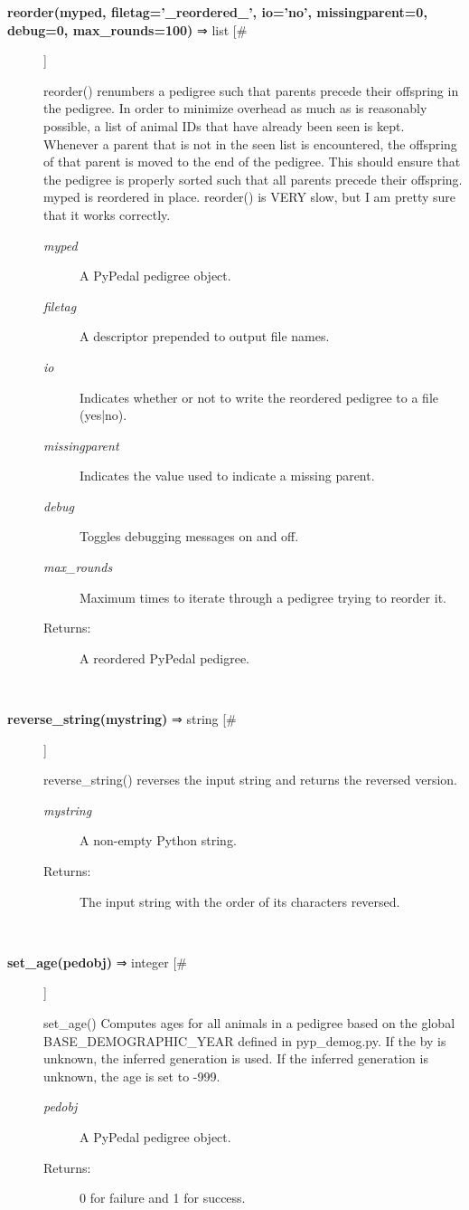 \begin{description}
\item[\textbf{reorder(myped, filetag='\_reordered\_', io='no', missingparent=0, debug=0, max\_rounds=100)} ⇒ list [\#]
]
\par reorder() renumbers a pedigree such that parents precede their offspring in the
pedigree.  In order to minimize overhead as much as is reasonably possible,
a list of animal IDs that have already been seen is kept.  Whenever a parent
that is not in the seen list is encountered, the offspring of that parent is
moved to the end of the pedigree.  This should ensure that the pedigree is
properly sorted such that all parents precede their offspring.  myped is
reordered in place.  reorder() is VERY slow, but I am pretty sure that it works
correctly.
\begin{description}
\item[\textit{myped}
]
A PyPedal pedigree object.
\item[\textit{filetag}
]
A descriptor prepended to output file names.
\item[\textit{io}
]
Indicates whether or not to write the reordered pedigree to a file (yes|no).
\item[\textit{missingparent}
]
Indicates the value used to indicate a missing parent.
\item[\textit{debug}
]
Toggles debugging messages on and off.
\item[\textit{max\_rounds}
]
Maximum times to iterate through a pedigree trying to reorder it.
\item[Returns:
]
A reordered PyPedal pedigree.
\end{description}\\

\item[\textbf{reverse\_string(mystring)} ⇒ string [\#]
]
\par reverse\_string() reverses the input string and returns the reversed version.
\begin{description}
\item[\textit{mystring}
]
A non-empty Python string.
\item[Returns:
]
The input string with the order of its characters reversed.
\end{description}\\

\item[\textbf{set\_age(pedobj)} ⇒ integer [\#]
]
\par set\_age() Computes ages for all animals in a pedigree based on the global
BASE\_DEMOGRAPHIC\_YEAR defined in pyp\_demog.py.  If the by is unknown, the
inferred generation is used.  If the inferred generation is unknown, the
age is set to -999.
\begin{description}
\item[\textit{pedobj}
]
A PyPedal pedigree object.
\item[Returns:
]
0 for failure and 1 for success.
\end{description}\\


\end{description}
